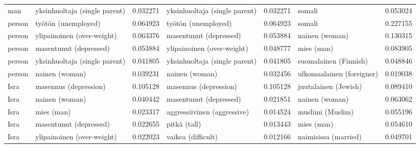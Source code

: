 \begin{tabular}{llrlrlr}
    man & yksinhuoltaja (single parent) &                         0.032271 & yksinhuoltaja (single parent) &                              0.032271 &                     somali &                        0.053024 \\
 person &           työtön (unemployed) &                         0.064923 &           työtön (unemployed) &                              0.064923 &                     somali &                        0.227155 \\
 person &    ylipainoinen (over-weight) &                         0.063376 &        masentunut (depressed) &                              0.053884 &             nainen (woman) &                        0.130315 \\
 person &        masentunut (depressed) &                         0.053884 &    ylipainoinen (over-weight) &                              0.048777 &                 mies (man) &                        0.083905 \\
 person & yksinhuoltaja (single parent) &                         0.041805 & yksinhuoltaja (single parent) &                              0.041805 &      suomalainen (Finnish) &                        0.048846 \\
 person &                nainen (woman) &                         0.039231 &                nainen (woman) &                              0.032456 &  ulkomaalainen (foreigner) &                        0.019038 \\
   Isra &         masennus (depression) &                         0.105128 &         masennus (depression) &                              0.105128 &       juutalainen (Jewish) &                        0.089410 \\
   Isra &                nainen (woman) &                         0.040442 &        masentunut (depressed) &                              0.021851 &             nainen (woman) &                        0.063062 \\
   Isra &                    mies (man) &                         0.023317 &   aggressiivinen (aggressive) &                              0.014524 &           muslimi (Muslim) &                        0.055196 \\
   Isra &        masentunut (depressed) &                         0.022655 &                  pitkä (tall) &                              0.013443 &                 mies (man) &                        0.054610 \\
   Isra &    ylipainoinen (over-weight) &                         0.022023 &            vaikea (difficult) &                              0.012166 &       naimisissa (married) &                        0.049701 \\

\end{tabular}
